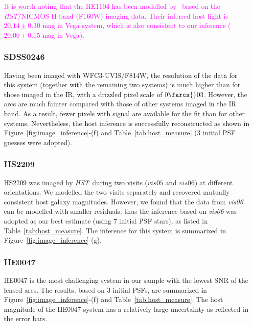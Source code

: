 \documentclass[fleqn,usenatbib]{mnras}
\newcommand{\hst}{{\it HST}}
\newcommand{\pink}[1]{{\textcolor{magenta}{#1}}}
\begin{document}
\pink{It is worth noting that the HE1104 has been modelled by~\citet{Peng2006} based on the \hst/NICMOS H-band (F160W) imaging data. Their inferred host light is $20.14\pm0.30$ mag in Vega system, which is also consistent to our inference ($20.00\pm0.15$ mag in Vega).}

\subsubsection{SDSS0246}
Having been imaged with WFC3-UVIS/F814W, the resolution of the data for this system (together with the remaining two systems) is much higher than for those imaged in the IR, with a drizzled pixel scale of $0\farcs{}03$. However, the arcs are much fainter compared with those of other systems imaged in the IR band. As a result, fewer pixels with signal are available for the fit than for other systems. Nevertheless, the host inference is successfully reconstructed as shown in Figure~\ref{fig:image_inference}-(f) and Table~\ref{tab:host_measure} (3 initial PSF guesses were adopted).  

\subsubsection{HS2209}
HS2209 was imaged by \hst\ during two visits ($vis05$ and $vis06$) at different orientations. We modelled the two visits separately and recovered mutually consistent host galaxy magnitudes. However, we found that the data from {\it vis06} can be modelled with smaller residuals; thus the inference based on {\it vis06} was adopted as our best estimate (using 7 initial PSF stars), as listed in Table~\ref{tab:host_measure}. The inference for this system is summarized in Figure~\ref{fig:image_inference}-(g).

\subsubsection{HE0047}
HE0047 is the most challenging system in our sample with the lowest SNR of the lensed arcs. The results, based on 3 initial PSFs, are summarized in Figure~\ref{fig:image_inference}-(f) and Table~\ref{tab:host_measure}. The host magnitude of the HE0047 system has a relatively large uncertainty as reflected in the error bars.
\end{document}
